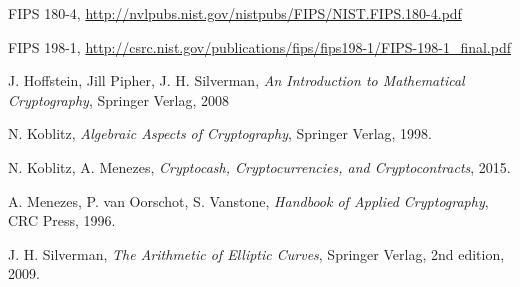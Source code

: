 \documentclass[a4paper,12pt]{article}
\begin{document}
\begin{thebibliography}{9}
FIPS 180-4,
\url{http://nvlpubs.nist.gov/nistpubs/FIPS/NIST.FIPS.180-4.pdf}

FIPS 198-1,
\url{http://csrc.nist.gov/publications/fips/fips198-1/FIPS-198-1_final.pdf}

J. Hoffstein, Jill Pipher, J. H. Silverman,
\emph{An Introduction to Mathematical Cryptography},
Springer Verlag,
2008

    N. Koblitz,
    \emph{Algebraic Aspects of Cryptography},
    Springer Verlag,
    1998.

N. Koblitz, A. Menezes,
\emph{Cryptocash, Cryptocurrencies, and Cryptocontracts},
2015.

A. Menezes, P. van Oorschot, S. Vanstone,
\emph{Handbook of Applied Cryptography},
CRC Press,
1996.


    J. H. Silverman,
    \emph{The Arithmetic of Elliptic Curves},
    Springer Verlag,
    2nd edition,
    2009.

\end{thebibliography}

\begin{comment}
COMMENTED OUT
\end{comment}
\end{document}
